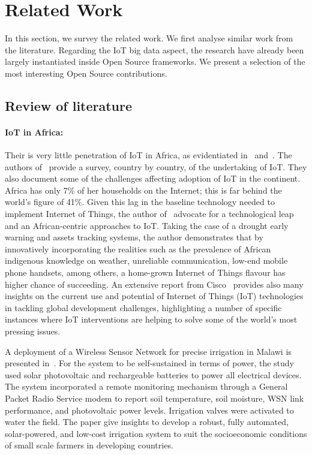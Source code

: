 \section{Related Work}
\label{sec:relworks}

In this section, we survey the related work.
We first analyse similar work from the literature.
Regarding the IoT big data aspect, the research have already been largely instantiated inside Open Source frameworks.
We present a selection of the most interesting Open Source contributions.

\subsection{Review of literature}

\paragraph{IoT in Africa:}
Their is very little penetration of IoT in Africa, as evidentiated in~\cite{Onyalo2015} and~\cite{Masinde2014}.
The authors of~\cite{Onyalo2015} provide a survey, country by country, of the undertaking of IoT.
They also document some of the challenges affecting adoption of IoT in the continent.
Africa has only 7\% of her households on the Internet; this is far behind the world’s figure of 41\%.
Given this lag in the baseline technology needed to implement Internet of Things, the author of~\cite{Masinde2014} advocate for a technological leap and an African-centric approaches to IoT.
Taking the case of a drought early warning and assets tracking systems, the author demonstrates that by innovatively incorporating the realities such as the prevalence of African indigenous knowledge on weather, unreliable communication, low-end mobile phone handsets, among others, a home-grown Internet of Things flavour has higher chance of succeeding.
An extensive report from Cisco~\cite{ITU2015} provides also many insights on the current use and potential of Internet of Things (IoT) technologies in tackling global development challenges, highlighting a number of specific instances where IoT interventions are helping to solve some of the world’s most pressing issues.


A deployment of a Wireless Sensor Network for precise irrigation in Malawi is presented in~\cite{Mafuta2013}.
For the system to be self-sustained in terms of power, the study used solar photovoltaic and rechargeable batteries to power all electrical devices.
The system incorporated a remote monitoring mechanism through a General Packet Radio Service modem to report soil temperature, soil moisture, WSN
link performance, and photovoltaic power levels. 
Irrigation valves were activated to water the field.
The paper give insights to develop a robust, fully automated, solar-powered, and low-cost irrigation system to suit the socioeconomic conditions of small scale farmers in developing countries.

